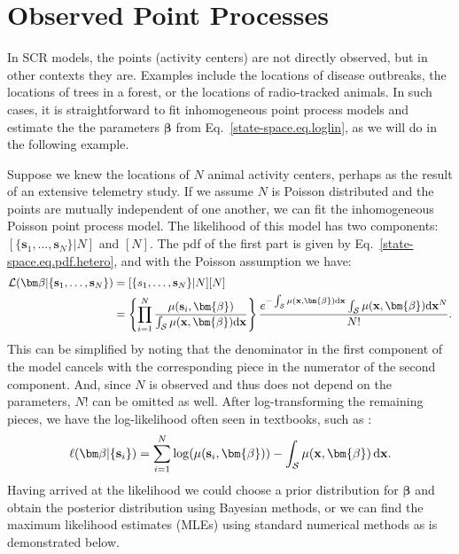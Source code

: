 \section{Observed Point Processes}

In SCR models, the points (activity centers) are not directly
observed, but in other contexts they are. Examples include the
locations of disease outbreaks, the locations of trees in a forest, or
the locations of radio-tracked animals. In such cases, it is
straightforward to fit inhomogeneous point process models and estimate the
the parameters $\bm \beta$ from Eq.~\ref{state-space.eq.loglin}, as we
will do in the following example. %

Suppose we knew the locations of $N$ animal activity
centers, perhaps as the result of an extensive telemetry study. %
If we assume $N$ is Poisson distributed and the points are
mutually independent of one another, we can fit the
inhomogeneous Poisson point process model. The likelihood of this
model has two components: $[\{\mathbf{s}_1, \ldots, \mathbf{s}_N\}|N]$
and $[N]$. The pdf of the first part is given by
Eq.~\ref{state-space.eq.pdf.hetero},
and with the Poisson assumption we have:
\begin{align*}
\mathcal{L}({\bm \beta} | \{{\bf s}_1, \ldots, \mathbf{s}_N\})
&= [\{s_1, \ldots, \mathbf{s}_N\}|N][N] \\
&= \left\{\prod_{i=1}^N
  \frac{\mu(\mathbf{s}_i,\bm{\beta})}{\int_{\mathcal{S}}\mu(\mathbf{x},\bm{\beta})\mathrm{d}\mathbf{x}} \right\}
  \frac{e^{-\int_{\mathcal{S}}\mu(\mathbf{x},\bm{\beta})\mathrm{d}\mathbf{x}}
    \int_{\mathcal{S}}\mu(\mathbf{x},\bm{\beta})\mathrm{d}\mathbf{x}^N}{N!}.
\end{align*}
This can be simplified by noting that the denominator in the first
component of the model cancels with the corresponding piece in the
numerator of the second component. And, since $N$ is observed and
thus does not depend on the parameters, $N!$ can be omitted as
well. After log-transforming the remaining pieces, we have the
log-likelihood often seen in textbooks, such as \citet[pg. 104]{diggle:2003}:
\[
\ell({\bm \beta} | \{{\bf s}_i\}) = \sum_{i=1}^N
\log(\mu(\mathbf{s}_i, \bm{\beta})) - \int_{\mathcal{S}} \mu(\mathbf{x}, \bm{\beta}) \, \mathrm{d} \mathbf{x} .
\]
Having arrived at the likelihood we could choose a prior distribution for
$\bm \beta$ and obtain the posterior distribution %
using Bayesian methods, or we can find the maximum likelihood
estimates (MLEs) using standard numerical methods as is demonstrated
below.

